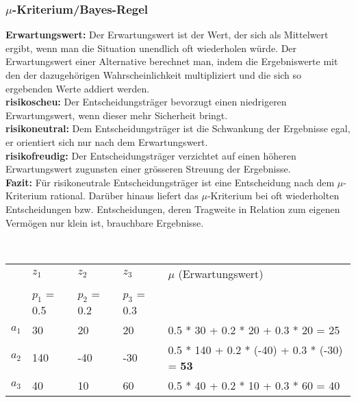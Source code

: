 \subsubsection{$\mu$-Kriterium/Bayes-Regel}
\textbf{Erwartungswert:} Der Erwartungswert ist der Wert, der sich als Mittelwert ergibt, wenn man die Situation unendlich oft wiederholen würde. Der Erwartungswert einer Alternative berechnet man, indem die Ergebniswerte mit den der dazugehörigen Wahrscheinlichkeit multipliziert und die sich so ergebenden Werte addiert werden. \\
\textbf{risikoscheu:} Der Entscheidungsträger bevorzugt einen niedrigeren Erwartungswert, wenn dieser mehr Sicherheit bringt.\\
\textbf{risikoneutral:} Dem Entscheidungsträger ist die Schwankung der Ergebnisse egal, er orientiert sich nur nach dem Erwartungswert.\\
\textbf{risikofreudig:} Der Entscheidungsträger verzichtet auf einen höheren Erwartungswert zugunsten einer grösseren Streuung der Ergebnisse.\\
\textbf{Fazit:} Für risikoneutrale Entscheidungsträger ist eine Entscheidung nach dem $\mu$-Kriterium rational. Darüber hinaus liefert das $\mu$-Kriterium bei oft wiederholten Entscheidungen bzw. Entscheidungen, deren Tragweite in Relation zum eigenen Vermögen nur klein ist, brauchbare Ergebnisse.
\begin{example} \\
	\begin{tabular}{|l|l|l|l|l|}
		\hline
		& $z_1$ & $z_2$ & $z_3$ & $\mu$ (Erwartungswert) \\
		& $p_1$ = 0.5 & $p_2$ = 0.2 & $p_3$ = 0.3 & \\ \hline
		$a_1$ & 30 & 20 & 20 & 0.5 * 30 + 0.2 * 20  + 0.3 * 20 = 25 \\ \hline
		$a_2$ & 140 & -40 & -30 & 0.5 * 140 + 0.2 * (-40) + 0.3 * (-30) = \textbf{53} \\ \hline
		$a_3$ & 40 & 10 & 60 & 0.5 * 40 + 0.2 * 10 + 0.3 * 60 = 40 \\ \hline		
	\end{tabular}
\end{example}

